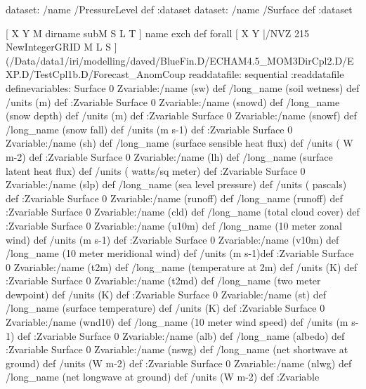 \begin{ingrid}
dataset: /name /PressureLevel def :dataset
dataset: /name /Surface def :dataset


[ X Y M dirname subM S L T ] { name exch def } forall
[ X Y |/NVZ 215  NewIntegerGRID M L S ]
(/Data/data1/iri/modelling/daved/BlueFin.D/ECHAM4.5_MOM3DirCpl2.D/EXP.D/TestCpl1b.D/Forecast_AnomCoup%
readdatafile:
sequential
:readdatafile
definevariables:
Surface 0 Zvariable:/name (sw) def /long_name (soil wetness)  def /units (m) def :Zvariable
Surface 0 Zvariable:/name (snowd) def /long_name (snow depth) def /units (m) def :Zvariable
Surface 0 Zvariable:/name (snowf) def /long_name (snow fall)  def /units (m s-1) def :Zvariable
Surface 0 Zvariable:/name (sh) def /long_name (surface sensible heat flux) def /units ( W m-2) def :Zvariable
Surface 0 Zvariable:/name (lh) def /long_name (surface latent heat flux) def /units ( watts/sq meter) def :Zvariable
Surface 0 Zvariable:/name (slp) def /long_name (sea level pressure) def /units ( pascals) def :Zvariable
Surface 0 Zvariable:/name (runoff) def /long_name (runoff) def :Zvariable
Surface 0 Zvariable:/name (cld) def /long_name (total cloud cover) def :Zvariable
Surface 0 Zvariable:/name (u10m) def /long_name (10 meter zonal wind) def /units (m s-1) def :Zvariable
Surface 0 Zvariable:/name (v10m) def /long_name (10 meter meridional wind) def /units (m s-1)def :Zvariable
Surface 0 Zvariable:/name (t2m) def /long_name (temperature at 2m) def /units (K) def :Zvariable
Surface 0 Zvariable:/name (t2md) def /long_name (two meter dewpoint) def /units (K) def :Zvariable
Surface 0 Zvariable:/name (st) def /long_name (surface temperature) def /units (K) def :Zvariable
Surface 0 Zvariable:/name (wnd10) def /long_name (10 meter wind speed) def /units (m s-1) def :Zvariable
Surface 0 Zvariable:/name (alb) def /long_name (albedo) def :Zvariable
Surface 0 Zvariable:/name (nswg) def /long_name (net shortwave at ground) def /units (W m-2) def :Zvariable
Surface 0 Zvariable:/name (nlwg) def /long_name (net longwave at ground) def /units (W m-2) def :Zvariable

\end{ingrid}
